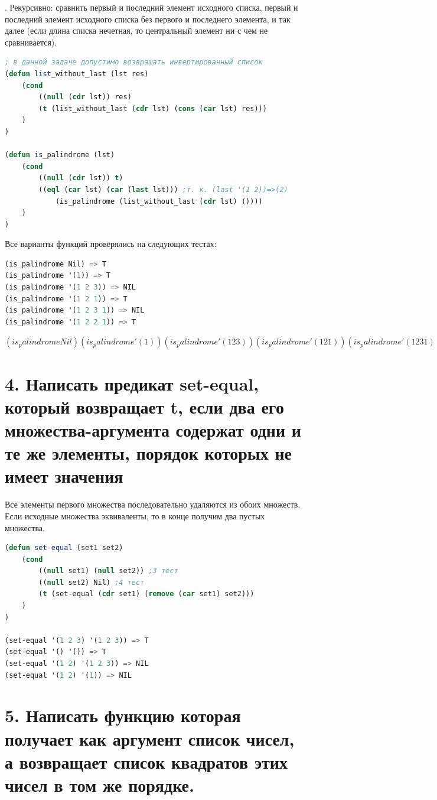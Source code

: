 \documentclass[12pt]{report}
\begin{document}
. Рекурсивно: сравнить первый и последний элемент исходного списка, первый и последний элемент исходного списка без первого и последнего элемента, и так далее (если длина списка нечетная, то центральный элемент ни с чем не сравнивается).

\begin{lstlisting}[language=Lisp]
; в данной задаче допустимо возвращать инвертированный список
(defun list_without_last (lst res)
	(cond
		((null (cdr lst)) res)
		(t (list_without_last (cdr lst) (cons (car lst) res)))
	)
)

(defun is_palindrome (lst)
	(cond 
		((null (cdr lst)) t)
		((eql (car lst) (car (last lst))) ;т. к. (last '(1 2))=>(2)
			(is_palindrome (list_without_last (cdr lst) ())))
	)
)
\end{lstlisting}


Все варианты функций проверялись на следующих тестах:
\begin{lstlisting}[language=Lisp]
(is_palindrome Nil) => T
(is_palindrome '(1)) => T
(is_palindrome '(1 2 3)) => NIL
(is_palindrome '(1 2 1)) => T
(is_palindrome '(1 2 3 1)) => NIL
(is_palindrome '(1 2 2 1)) => T
\end{lstlisting}

$
(is_palindrome Nil)
(is_palindrome '(1))
(is_palindrome '(1 2 3))
(is_palindrome '(1 2 1))
(is_palindrome '(1 2 3 1))
(is_palindrome '(1 2 2 1))
$
\fi

\clearpage
\section*{4. Написать предикат set-equal, который возвращает t, если два его множества-аргумента содержат одни и те же элементы, порядок которых не имеет значения}

Все элементы первого множества последовательно удаляются из обоих множеств. Если исходные множества эквиваленты, то в конце получим два пустых множества.

\begin{lstlisting}[language=Lisp]
(defun set-equal (set1 set2)
	(cond 
		((null set1) (null set2)) ;3 тест
		((null set2) Nil) ;4 тест
		(t (set-equal (cdr set1) (remove (car set1) set2)))
	)
)

(set-equal '(1 2 3) '(1 2 3)) => T
(set-equal '() '()) => T
(set-equal '(1 2) '(1 2 3)) => NIL
(set-equal '(1 2) '(1)) => NIL
\end{lstlisting}


\section*{5. Написать функцию которая получает как аргумент список чисел, а возвращает список квадратов этих чисел в том же порядке.}
\end{document}
